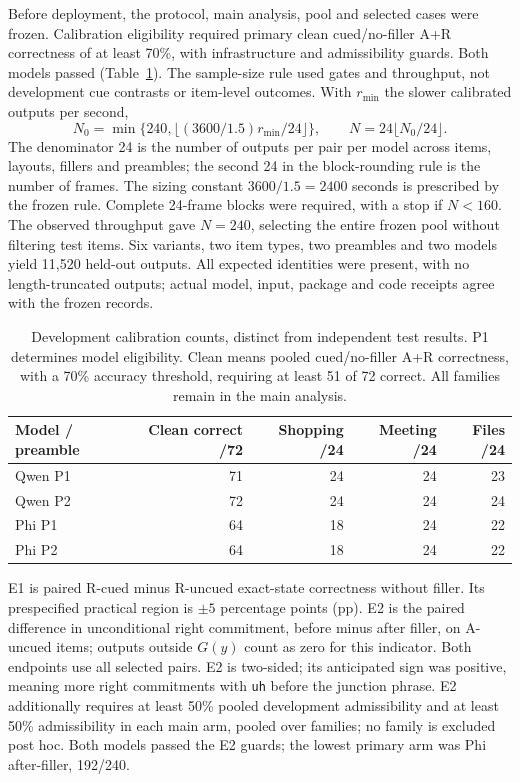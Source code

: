 \documentclass[11pt]{article}
\begin{document}
Before deployment, the protocol, main analysis, pool and selected cases were frozen. Calibration eligibility required primary clean cued/no-filler A+R correctness of at least 70\%, with infrastructure and admissibility guards. Both models passed (Table~\ref{tab:cal}). The sample-size rule used gates and throughput, not development cue contrasts or item-level outcomes. With $r_{\min}$ the slower calibrated outputs per second,
\[N_0=\min\{240,\lfloor(3600/1.5)r_{\min}/24\rfloor\},\qquad N=24\lfloor N_0/24\rfloor.\]
The denominator 24 is the number of outputs per pair per model across items, layouts, fillers and preambles; the second 24 in the block-rounding rule is the number of frames. The sizing constant $3600/1.5=2400$ seconds is prescribed by the frozen rule. Complete 24-frame blocks were required, with a stop if $N<160$. The observed throughput gave $N=240$, selecting the entire frozen pool without filtering test items. Six variants, two item types, two preambles and two models yield 11,520 held-out outputs. All expected identities were present, with no length-truncated outputs; actual model, input, package and code receipts agree with the frozen records.

\begin{table}[ht]
\centering\small
\begin{tabular}{lrrrr}\toprule
Model / preamble & Clean correct /72 & Shopping /24 & Meeting /24 & Files /24\\\midrule
Qwen P1 &71&24&24&23\\
Qwen P2 &72&24&24&24\\
Phi P1 &64&18&24&22\\
Phi P2 &64&18&24&22\\\bottomrule
\end{tabular}
\caption{Development calibration counts, distinct from independent test results. P1 determines model eligibility. Clean means pooled cued/no-filler A+R correctness, with a 70\% accuracy threshold, requiring at least 51 of 72 correct. All families remain in the main analysis.}\label{tab:cal}
\end{table}

E1 is paired R-cued minus R-uncued exact-state correctness without filler. Its prespecified practical region is $\pm5$ percentage points (pp). E2 is the paired difference in unconditional right commitment, before minus after filler, on A-uncued items; outputs outside $G(y)$ count as zero for this indicator. Both endpoints use all selected pairs. E2 is two-sided; its anticipated sign was positive, meaning more right commitments with \texttt{uh} before the junction phrase. E2 additionally requires at least 50\% pooled development admissibility and at least 50\% admissibility in each main arm, pooled over families; no family is excluded post hoc. Both models passed the E2 guards; the lowest primary arm was Phi after-filler, 192/240.
\end{document}
